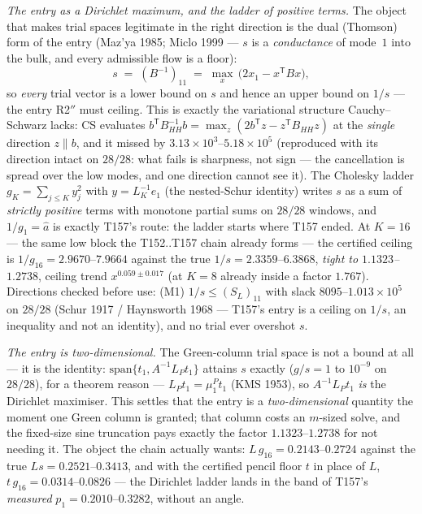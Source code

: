 \documentclass[11pt,a4paper]{article}
\begin{document}
\emph{The entry as a Dirichlet maximum, and the ladder of positive terms.} The object
that makes trial spaces legitimate in the right direction is the dual (Thomson) form of
the entry (Maz'ya 1985; Miclo 1999 --- $s$ is a \emph{conductance} of mode~$1$ into the
bulk, and every admissible flow is a floor):
\[
s \;=\; (B^{-1})_{11} \;=\; \max_x\,\bigl(2x_1-x^{\mathsf T}Bx\bigr),
\]
so \emph{every} trial vector is a lower bound on $s$ and hence an upper bound on $1/s$
--- the entry R2$''$ must ceiling. This is exactly the variational structure
Cauchy--Schwarz lacks: CS evaluates $b^{\mathsf T}B_{HH}^{-1}b=\max_z(2b^{\mathsf
T}z-z^{\mathsf T}B_{HH}z)$ at the \emph{single} direction $z\parallel b$, and it missed
by $3.13\times10^{3}$--$5.18\times10^{5}$ (reproduced with its direction intact on
$28/28$: what fails is sharpness, not sign --- the cancellation is spread over the low
modes, and one direction cannot see it). The Cholesky ladder $g_K=\sum_{j\le K}y_j^2$
with $y=L_K^{-1}e_1$ (the nested-Schur identity) writes $s$ as a sum of \emph{strictly
positive} terms with monotone partial sums on $28/28$ windows, and $1/g_1=\hat a$ is
exactly T157's route: the ladder starts where T157 ended. At $K=16$ --- the same low
block the T152..T157 chain already forms --- the certified ceiling is
$1/g_{16}=2.9670$--$7.9664$ against the true $1/s=2.3359$--$6.3868$, \emph{tight to
$1.1323$--$1.2738$}, ceiling trend $x^{0.059\pm0.017}$ (at $K=8$ already inside a
factor $1.767$). Directions checked before use: (M1) $1/s\le(S_L)_{11}$ with slack
$8095$--$1.013\times10^{5}$ on $28/28$ (Schur 1917 / Haynsworth 1968 --- T157's entry
is a ceiling on $1/s$, an inequality and not an identity), and no trial ever overshot
$s$.

\emph{The entry is two-dimensional.} The Green-column trial space is not a bound at all
--- it is the identity: $\mathrm{span}\{t_1,A^{-1}L_Pt_1\}$ attains $s$ exactly ($g/s=1$
to $10^{-9}$ on $28/28$), for a theorem reason --- $L_Pt_1=\mu^P_1t_1$ (KMS 1953), so
$A^{-1}L_Pt_1$ \emph{is} the Dirichlet maximiser. This settles that the entry is a
\emph{two-dimensional} quantity the moment one Green column is granted; that column
costs an $m$-sized solve, and the fixed-size sine truncation pays exactly the factor
$1.1323$--$1.2738$ for not needing it. The object the chain actually wants:
$L\,g_{16}=0.2143$--$0.2724$ against the true $Ls=0.2521$--$0.3413$, and with the
certified pencil floor $t$ in place of $L$, $t\,g_{16}=0.0314$--$0.0826$ --- the
Dirichlet ladder lands in the band of T157's \emph{measured} $p_1=0.2010$--$0.3282$,
without an angle.
\end{document}

